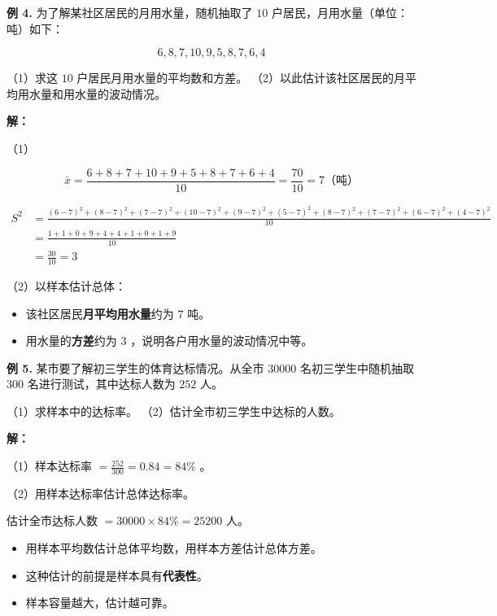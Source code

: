 \begin{workedexamples}


\textbf{例 4.} 为了解某社区居民的月用水量，随机抽取了 $10$ 户居民，月用水量（单位：吨）如下：

\[
6, 8, 7, 10, 9, 5, 8, 7, 6, 4
\]


（1）求这 $10$ 户居民月用水量的平均数和方差。
（2）以此估计该社区居民的月平均用水量和用水量的波动情况。

\textbf{解：}

（1）

\[
\bar{x} = \frac{6 + 8 + 7 + 10 + 9 + 5 + 8 + 7 + 6 + 4}{10} = \frac{70}{10} = 7 \text{（吨）}
\]


\[
\begin{aligned}
S^2 &= \frac{(6-7)^2 + (8-7)^2 + (7-7)^2 + (10-7)^2 + (9-7)^2 + (5-7)^2 + (8-7)^2 + (7-7)^2 + (6-7)^2 + (4-7)^2}{10} \\
&= \frac{1 + 1 + 0 + 9 + 4 + 4 + 1 + 0 + 1 + 9}{10} \\
&= \frac{30}{10} = 3
\end{aligned}
\]


（2）以样本估计总体：

\begin{itemize}
  \item 该社区居民\textbf{月平均用水量}约为 $7$ 吨。
  \item 用水量的\textbf{方差}约为 $3$ ，说明各户用水量的波动情况中等。
\end{itemize}


\textbf{例 5.} 某市要了解初三学生的体育达标情况。从全市 $30000$ 名初三学生中随机抽取 $300$ 名进行测试，其中达标人数为 $252$ 人。

（1）求样本中的达标率。
（2）估计全市初三学生中达标的人数。

\textbf{解：}

（1）样本达标率 $= \frac{252}{300} = 0.84 = 84\%$ 。

（2）用样本达标率估计总体达标率。

估计全市达标人数 $= 30000 \times 84\% = 25200$ 人。

\end{workedexamples}

\begin{keytakeaway}


\begin{itemize}
  \item 用样本平均数估计总体平均数，用样本方差估计总体方差。
  \item 这种估计的前提是样本具有\textbf{代表性}。
  \item 样本容量越大，估计越可靠。
\end{itemize}


\end{keytakeaway}



